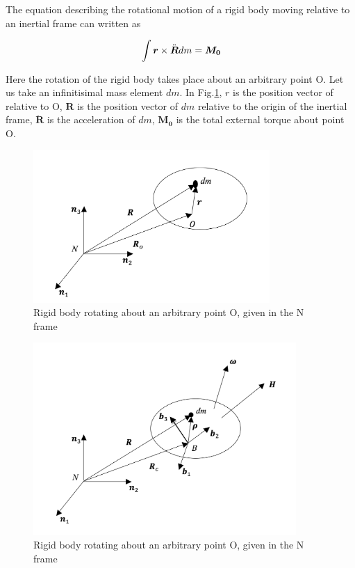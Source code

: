 The equation describing the rotational motion of a rigid body moving 
relative to an inertial frame can written as \cite{wie1998space}

\begin{equation}{\label{eqn:kinematicEquDQM}}
\int \bm{r} \times \ddot{\bm{R}} dm = \bm{M_0}
\end{equation}

Here the rotation of the rigid body takes place about an arbitrary point O. 
Let us take an infinitisimal mass element $dm$. In Fig.\ref{fig:attDyn1}, 
$r$ is the position vector of  relative to O,  $\bm{R}$ is the position vector 
of $dm$ relative to the origin of the inertial frame, $\ddot{\bm{R}}$ is 
the acceleration of $dm$, $\bm{M_0}$ is the total external torque about point O.

\begin{figure}
\begin{center}
\includegraphics[width=9cm]{figures/attDyn1}    %
\caption{Rigid body rotating about an arbitrary point O, given in the N frame} 
\label{fig:attDyn1}
\end{center}
\end{figure}

\begin{figure}
\begin{center}
\includegraphics[width=10cm]{figures/attDyn2}    %
\caption{Rigid body rotating about an arbitrary point O, given in the N frame} 
\label{fig:attDyn2}
\end{center}
\end{figure}

